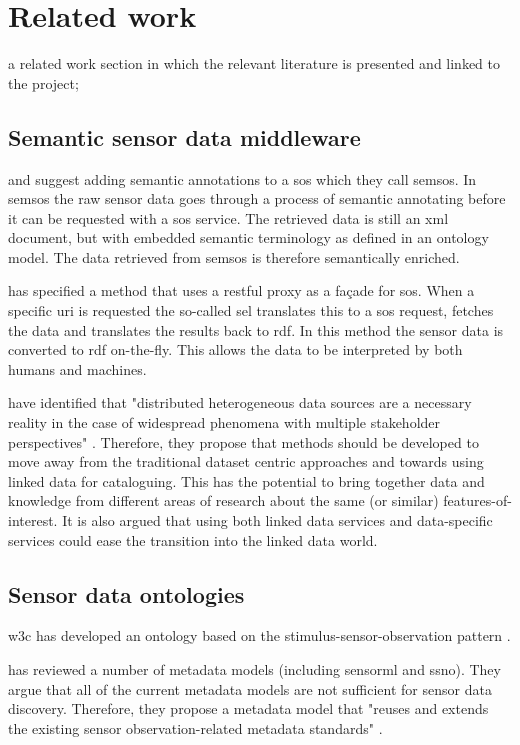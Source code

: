 \chapter{Related work}
\label{chap:rw}

a related work section in which the relevant literature is presented and linked to the project;
\section{Semantic sensor data middleware}
\cite{SSW:Henson} and \cite{SSW:Pschorr} suggest adding semantic annotations to a \ac{sos} which they call \ac{semsos}. In \ac{semsos} the raw sensor data goes through a process of semantic annotating before it can be requested with a \ac{sos} service. The retrieved data is still an \ac{xml} document, but with embedded semantic terminology as defined in an ontology model. The data retrieved from \ac{semsos} is therefore semantically enriched.  

\cite{SSW:Janowicz} has specified a method that uses a \ac{rest}ful proxy as a fa\c{c}ade for \ac{sos}. When a specific \ac{uri} is requested the so-called \ac{sel} translates this to a \ac{sos} request, fetches the data and translates the results back to \ac{rdf}. In this method the sensor data is converted to \ac{rdf} on-the-fly. This allows the data to be interpreted by both humans and machines.  

\cite{SSW:Atkinson} have identified that "distributed heterogeneous data sources are a necessary reality in the case of widespread
phenomena with multiple stakeholder perspectives" \cite[p.129]{SSW:Atkinson}. Therefore, they propose that methods should be developed to move away from the traditional dataset centric approaches and towards using linked data for cataloguing. This has the potential to bring together data and knowledge from different areas of research about the same (or similar) features-of-interest. It is also argued that using both linked data services and data-specific services could ease the transition into the linked data world.  

\section{Sensor data ontologies}
 \ac{w3c} has developed an ontology based on the stimulus-sensor-observation pattern \citep{SSW:SSN_incubatorGroup}.

\cite{SW:Hu} has reviewed a number of metadata models (including \ac{sensorml} and \ac{ssno}). They argue that all of the current metadata models are not sufficient for sensor data discovery. Therefore, they propose a metadata model that "reuses and extends the existing sensor observation-related metadata standards" \cite[p. 10546]{SW:Hu}.

